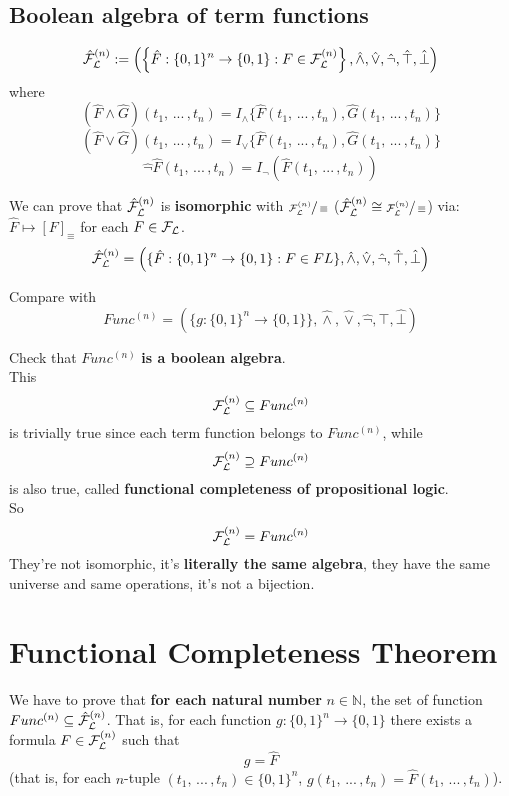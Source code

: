 	\newpage

	\subsection{Boolean algebra of term functions}

	$$ \hat{\mathcal{F}}_\mathcal{L}^{(n)} := \left( \left\{\hat F: \{0,1\}^n \rightarrow \{0,1\}: F \in \mathcal{F}_\mathcal{L}^{(n)} \right\}, \hat \wedge, \hat \vee, \hat \neg, \hat \top, \hat \bot \right)$$
	where
	$$ (\hat F \wedge \hat G) (t_1, \, ... \, , t_n) = I_\wedge \{\hat F (t_1, \, ... \, , t_n), \hat G (t_1, \, ... \, , t_n)\}$$
	$$ (\hat F \vee \hat G) (t_1, \, ... \, , t_n) = I_\vee \{\hat F (t_1, \, ... \, , t_n), \hat G (t_1, \, ... \, , t_n)\}$$
	$$ \hat \neg \hat F (t_1, \, ... \, , t_n) = I_\neg (\hat F (t_1, \, ... \, , t_n)) $$

	We can prove that $\hat{\mathcal{F}}_\mathcal{L}^{(n)}$ is \textbf{isomorphic} with $\sfrac{\mathcal{F}_\mathcal{L}^{(n)}}{\equiv}$ ($\hat{\mathcal{F}}_\mathcal{L}^{(n)} \cong \sfrac{\mathcal{F}_\mathcal{L}^{(n)}}{\equiv}$) via: $\hat F \mapsto [F]_\equiv$ for each $F \in \mathcal{F}_\mathcal{L}$.\\

	$$\hat{\mathcal{F}}_\mathcal{L}^{(n)} = \left(\{ \hat F: \{0,1\}^n \rightarrow \{0,1\}: F \in FL\}, \hat \wedge, \hat \vee, \hat \neg, \hat \top, \hat \bot \right)$$

	Compare with
	$$ Func^{(n)} = \left(\{ g: \{0,1\}^n \rightarrow \{0,1\} \}, \hat \wedge, \hat \vee, \hat \neg, \hat \top, \hat \bot \right)$$

	Check that $Func^{(n)}$ \textbf{is a boolean algebra}.\\

	This
	$$ \mathcal{F}_\mathcal{L}^{(n)} \subseteq Func^{(n)}$$
	is trivially true since each term function belongs to $Func^{(n)}$, while
	$$ \mathcal{F}_\mathcal{L}^{(n)} \supseteq Func^{(n)}$$
	is also true, called \textbf{functional completeness of propositional logic}.\\

	So
	$$ \mathcal{F}_\mathcal{L}^{(n)} = Func^{(n)} $$
	They're not isomorphic, it's \textbf{literally the same algebra}, they have the same universe and same operations, it's not a bijection.

	\newpage

	\section{Functional Completeness Theorem}

	We have to prove that \textbf{for each natural number} $n \in \mathbb{N}$, the set of function $Func^{(n)} \subseteq \hat{\mathcal{F}}_\mathcal{L}^{(n)}$. That is, for each function $g: \{0,1\}^n \rightarrow \{0,1\}$ there exists a formula $F \in \mathcal{F}_\mathcal{L}^{(n)}$ such that
	$$ g = \hat F$$
	(that is, for each $n$-tuple $(t_1, \, ... \, , t_n) \in \{0,1\}^n$, $g (t_1, \, ... \, , t_n) = \hat F (t_1, \, ... \, , t_n)$).\\

